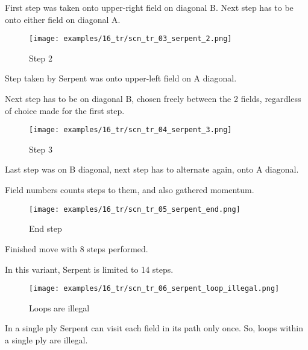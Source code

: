 First step was taken onto upper-right field on diagonal B.
Next step has to be onto either field on diagonal A.

\vspace*{4.4\baselineskip}
\noindent
\begin{wrapfigure}[9]{l}{0.4\textwidth} %
\centering
\texttt{[image: examples/16\_tr/scn\_tr\_03\_serpent\_2.png]}
\vspace*{-0.4\baselineskip}
\caption{Step 2}
\label{fig:scn_tr_03_serpent_2}
\end{wrapfigure}
Step taken by Serpent was onto upper-left field on A diagonal.

Next step has to be on diagonal B, chosen freely between the 2 fields,
regardless of choice made for the first step.

\clearpage %

\vspace*{-1.2\baselineskip}
\noindent
\begin{wrapfigure}[6]{l}{0.4\textwidth}
\centering
\texttt{[image: examples/16\_tr/scn\_tr\_04\_serpent\_3.png]}
\vspace*{-0.5\baselineskip}
\caption{Step 3}
\label{fig:scn_tr_04_serpent_3}
\end{wrapfigure}
Last step was on B diagonal, next step has to alternate again, onto A diagonal.

Field numbers counts steps to them, and also gathered momentum.

\vspace*{2.7\baselineskip}
\noindent
\begin{wrapfigure}[4]{l}{0.4\textwidth}
\centering
\texttt{[image: examples/16\_tr/scn\_tr\_05\_serpent\_end.png]}
\vspace*{-0.5\baselineskip}
\caption{End step}
\label{fig:scn_tr_05_serpent_end}
\end{wrapfigure}
Finished move with 8 steps performed.

In this variant, Serpent is limited to 14 steps.

\vspace*{4.7\baselineskip}
\noindent
\begin{wrapfigure}[9]{l}{0.4\textwidth}
\centering
\texttt{[image: examples/16\_tr/scn\_tr\_06\_serpent\_loop\_illegal.png]}
\vspace*{-0.5\baselineskip}
\caption{Loops are illegal}
\label{fig:scn_tr_06_serpent_loop_illegal}
\end{wrapfigure}
In a single ply Serpent can visit each field in its path only once.
So, loops within a single ply are illegal.

